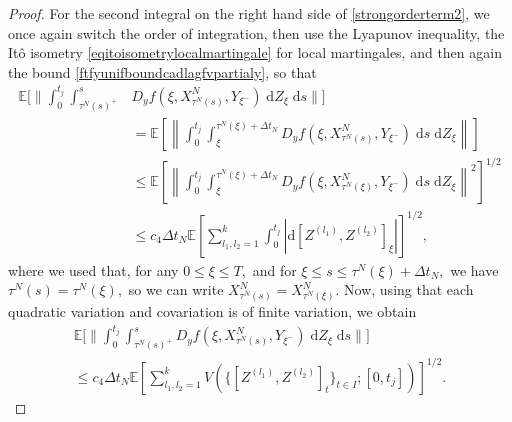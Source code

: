 \documentclass[reqno,12pt]{amsart}
\theoremstyle{plain} %
\theoremstyle{definition} %
\begin{document}
\begin{proof}
    For the second integral on the right hand side of \cref{strongorderterm2}, we once again switch the order of integration, then use the Lyapunov inequality, the It\^o isometry \cref{eqitoisometrylocalmartingale} for local martingales, and then again the bound \cref{ftfyunifboundcadlagfvpartialy}, so that
    \begin{align*}
        \mathbb{E}\bigg[\bigg\|\int_0^{t_j} \int_{\tau^N(s)^+}^s & D_y f(\xi, X_{\tau^N(s)}^N, Y_{\xi^-}) \;\mathrm{d}Z_\xi\;\mathrm{d}s\bigg\|\bigg] \\
        & = \mathbb{E}\left[\left\|\int_0^{t_j} \int_{\xi}^{\tau^N(\xi) + \Delta t_N} D_y f(\xi, X_{\tau^N(s)}^N, Y_{\xi^-}) \;\mathrm{d}s \;\mathrm{d}Z_\xi\right\|\right] \\
        & \leq \mathbb{E}\left[\left\|\int_0^{t_j} \int_{\xi}^{\tau^N(\xi) + \Delta t_N} D_y f(\xi, X_{\tau^N(\xi)}^N, Y_{\xi^-}) \;\mathrm{d}s \;\mathrm{d}Z_\xi\right\|^2\right]^{1/2} \\
        & \leq c_4\Delta t_N\mathbb{E}\left[\sum_{l_1,l_2=1}^k\int_0^{t_j} \left|\mathrm{d}[Z^{(l_1)}, Z^{(l_2)}]_\xi\right|\right]^{1/2},
    \end{align*}
    where we used that, for any $0 \leq \xi \leq T,$ and for $\xi \leq s \leq \tau^N(\xi) + \Delta t_N,$ we have $\tau^N(s) = \tau^N(\xi),$ so we can write $X_{\tau^N(s)}^N = X_{\tau^N(\xi)}^N.$ Now, using that each quadratic variation and covariation is of finite variation, we obtain
    \begin{multline}
        \label{strongorderterm2b}
        \mathbb{E}\bigg[\bigg\|\int_0^{t_j} \int_{\tau^N(s)^+}^s D_y f(\xi, X_{\tau^N(s)}^N, Y_{\xi^-}) \;\mathrm{d}Z_\xi\;\mathrm{d}s\bigg\|\bigg] \\ 
        \leq c_4\Delta t_N\mathbb{E}\left[\sum_{l_1,l_2=1}^k V(\{[Z^{(l_1)}, Z^{(l_2)}]_t\}_{t\in I}; [0, t_j])\right]^{1/2}.
    \end{multline}
    

\end{proof}
\end{document}

